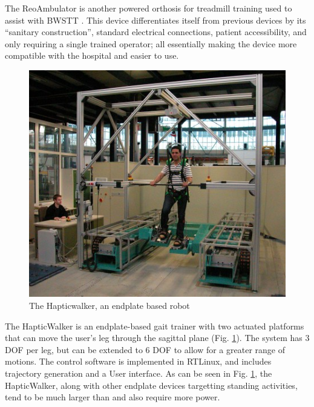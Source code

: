 \documentclass[12pt]{report}
\begin{document}
	The ReoAmbulator is another powered orthosis for treadmill training used to assist with BWSTT \cite{West2002}. This device differentiates itself from previous devices by its ``sanitary construction'', standard electrical connections, patient accessibility, and only requiring a single trained operator; all essentially making the device more compatible with the hospital and easier to use. 
	
	
	
	\begin{figure}[h] 
		\centering
		\includegraphics[width=0.7\linewidth]{Hapticwalker}
		\caption{The Hapticwalker, an endplate based robot}
		\label{fig:Hapticwalker}
	\end{figure}
	
	The HapticWalker \cite{Schmidt2005} is an endplate-based gait trainer with two actuated platforms that can move the user's leg through the sagittal plane (Fig. \ref{fig:Hapticwalker}). The system has 3 DOF per leg, but can be extended to 6 DOF to allow for a greater range of motions. The control software is implemented in RTLinux, and includes trajectory generation and a User interface. As can be seen in Fig. \ref{fig:Hapticwalker}, the HapticWalker, along with other endplate devices targetting standing activities, tend to be much larger than and also require more power.
	
\end{document}
